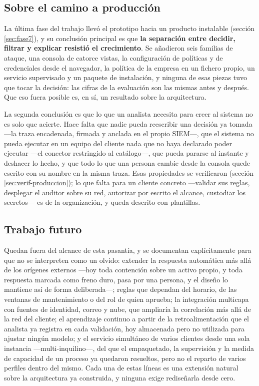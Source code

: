 \subsection*{Sobre el camino a producción}

La última fase del trabajo llevó el prototipo hacia un producto instalable (sección
\ref{sec:fase7}), y su conclusión principal es que \textbf{la separación entre decidir, filtrar y
explicar resistió el crecimiento}. Se añadieron seis familias de ataque, una consola de catorce
vistas, la configuración de políticas y de credenciales desde el navegador, la política de la
empresa en un fichero propio, un servicio supervisado y un paquete de instalación, y ninguna de esas
piezas tuvo que tocar la decisión: las cifras de la evaluación son las mismas antes y después. Que eso fuera posible es, en sí, un resultado sobre la
arquitectura.

La segunda conclusión es que lo que un analista necesita para creer al sistema no es solo que
acierte. Hace falta que nadie pueda reescribir una decisión ya tomada ---la traza encadenada,
firmada y anclada en el propio SIEM---, que el sistema no pueda ejecutar en un equipo del cliente
nada que no haya declarado poder ejecutar ---el conector restringido al catálogo---, que pueda
pararse al instante y deshacer lo hecho, y que todo lo que una persona cambie desde la consola quede
escrito con su nombre en la misma traza. Esas propiedades se verificaron (sección
\ref{sec:verif-produccion}); lo que falta para un cliente concreto ---validar sus reglas, desplegar
el auditor sobre su red, autorizar por escrito el alcance, custodiar los secretos--- es de la
organización, y queda descrito con plantillas.

\subsection*{Trabajo futuro}

Quedan fuera del alcance de esta pasantía, y se documentan explícitamente para que no se
interpreten como un olvido: extender la respuesta automática más allá de los orígenes externos
---hoy toda contención sobre un activo propio, y toda respuesta marcada como freno duro, pasa por
una persona, y el diseño lo mantiene así de forma deliberada---; reglas que dependan del horario,
de las ventanas de mantenimiento o del rol de quien aprueba; la integración multicapa con fuentes de identidad, correo y
nube, que ampliaría la correlación más allá de la red del cliente; el aprendizaje continuo a partir
de la retroalimentación que el analista ya registra en cada validación, hoy almacenada pero no
utilizada para ajustar ningún modelo; y el servicio simultáneo de varios clientes desde una sola
instancia ---multi-inquilino---, del que el empaquetado, la supervisión y la medida de capacidad de
un proceso ya quedaron resueltos, pero no el reparto de varios perfiles dentro del mismo. Cada una
de estas líneas es una extensión natural sobre la arquitectura ya construida, y ninguna exige
rediseñarla desde cero.
